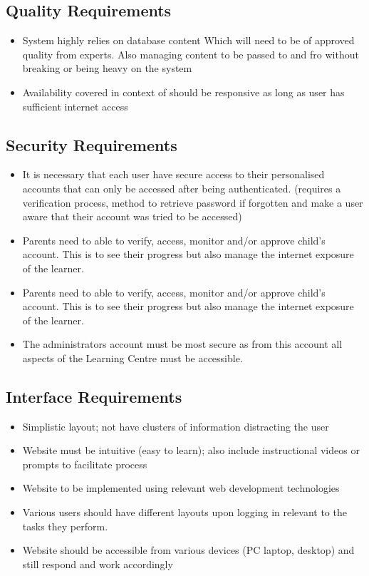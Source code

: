 \documentclass[10pt]{article}
\begin{document}
\subsection*{Quality Requirements}
\begin{itemize}
\item System highly relies on database content {\newline \footnotesize Which will need to be of approved quality from experts. Also managing content to be passed to and fro without breaking or being heavy on the system}
\item Availability covered in context of should be responsive as long as user has sufficient internet access
\end{itemize}

\subsection*{Security Requirements}
\begin{itemize}
\item It is necessary that each user have secure access to their personalised accounts that can only be accessed after being authenticated. (requires a verification process, method to retrieve password if forgotten and make a user aware that their account was tried to be accessed)
\item Parents need to able to verify, access, monitor and/or approve child’s account. This is to see their progress but also manage the internet exposure of the learner.
\item Parents need to able to verify, access, monitor and/or approve child’s account. This is to see their progress but also manage the internet exposure of the learner.
\item The administrators account must be most secure as from this account all aspects of the Learning Centre must be accessible.
\end{itemize}

\subsection*{Interface Requirements}
\begin{itemize}
\item Simplistic layout; not have clusters of information distracting the user
\item Website must be intuitive (easy to learn); also include instructional videos or prompts to facilitate process
\item Website to be implemented using relevant web development technologies
\item Various users should have different layouts upon logging in relevant to the tasks they perform.
\item Website should be accessible from various devices (PC laptop, desktop) and still respond and work accordingly
\end{itemize}
\end{document}
